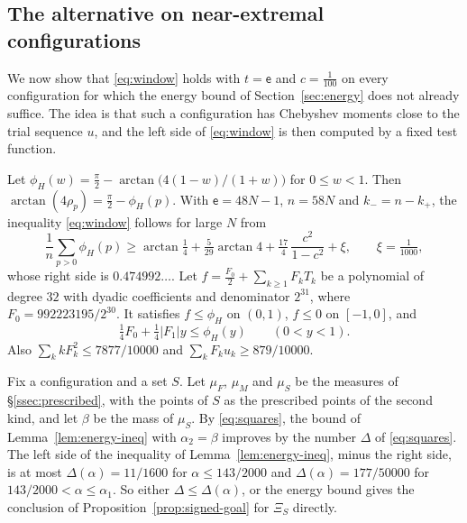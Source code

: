 \subsection{The alternative on near-extremal configurations}\label{ssec:alternative}
We now show that \eqref{eq:window} holds with $t=\mathsf e$ and $c=\frac1{100}$ on every configuration for which the
energy bound of Section~\ref{sec:energy} does not already suffice. The idea is that such a configuration has
Chebyshev moments close to the trial sequence $u$, and the left side of \eqref{eq:window} is then computed by a
fixed test function.

Let $\phi_H(w)=\frac\pi2-\arctan\bigl(4(1-w)/(1+w)\bigr)$ for $0\le w<1$. Then $\arctan(4\rho_p)=\frac\pi2-\phi_H(p)$.
With $\mathsf e=48N-1$, $n=58N$ and $k_-=n-k_+$, the inequality \eqref{eq:window} follows for large $N$ from
\begin{equation}\label{eq:phaseneed}
 \frac1n\sum_{p>0}\phi_H(p)\ge\arctan\tfrac14+\tfrac5{29}\arctan4+\tfrac{17}4\,\frac{c^2}{1-c^2}+\xi,\qquad \xi=\tfrac1{1000},
\end{equation}
whose right side is $0.474992\ldots$. Let $f=\frac{F_0}2+\sum_{k\ge1}F_kT_k$ be a polynomial of degree $32$ with
dyadic coefficients and denominator $2^{31}$, where $F_0=992223195/2^{30}$. 
It satisfies $f\le\phi_H$ on $(0,1)$, $f\le0$ on $[-1,0]$, and
\begin{equation}\label{eq:testS}
 \tfrac14F_0+\tfrac14|F_1|y\le\phi_H(y)\qquad(0<y<1).
\end{equation}
Also $\sum_kkF_k^2\le7877/10000$ and $\sum_kF_ku_k\ge879/10000$.

Fix a configuration and a set $S$. Let $\mu_F$, $\mu_M$ and $\mu_S$ be the measures of \S\ref{ssec:prescribed}, with the points of $S$ as the
prescribed points of the second kind, and let $\beta$ be the mass of $\mu_S$. By \eqref{eq:squares}, the bound of Lemma~\ref{lem:energy-ineq} with
$\alpha_2=\beta$ improves by the number $\Delta$ of \eqref{eq:squares}. The left side of the inequality of Lemma~\ref{lem:energy-ineq}, minus the right
side, is at most $\Delta(\alpha)=11/1600$ for $\alpha\le143/2000$ and $\Delta(\alpha)=177/50000$ for
$143/2000<\alpha\le\alpha_1$. So either $\Delta\le\Delta(\alpha)$, or the energy bound gives the conclusion of
Proposition~\ref{prop:signed-goal} for $\Xi_S$ directly.

